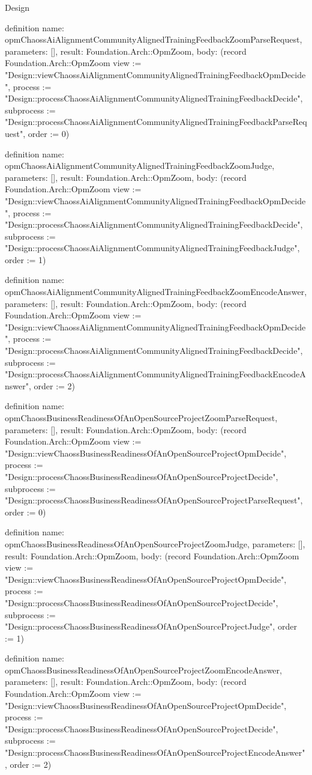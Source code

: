 \begin{lexlean}{Design}
\begin{semanticmodule}
definition{
  name: opmChaossAiAlignmentCommunityAlignedTrainingFeedbackZoomParseRequest,
  parameters: [],
  result: Foundation.Arch::OpmZoom,
  body: (record Foundation.Arch::OpmZoom {view := "Design::viewChaossAiAlignmentCommunityAlignedTrainingFeedbackOpmDecide", process := "Design::processChaossAiAlignmentCommunityAlignedTrainingFeedbackDecide", subprocess := "Design::processChaossAiAlignmentCommunityAlignedTrainingFeedbackParseRequest", order := 0})
}

definition{
  name: opmChaossAiAlignmentCommunityAlignedTrainingFeedbackZoomJudge,
  parameters: [],
  result: Foundation.Arch::OpmZoom,
  body: (record Foundation.Arch::OpmZoom {view := "Design::viewChaossAiAlignmentCommunityAlignedTrainingFeedbackOpmDecide", process := "Design::processChaossAiAlignmentCommunityAlignedTrainingFeedbackDecide", subprocess := "Design::processChaossAiAlignmentCommunityAlignedTrainingFeedbackJudge", order := 1})
}

definition{
  name: opmChaossAiAlignmentCommunityAlignedTrainingFeedbackZoomEncodeAnswer,
  parameters: [],
  result: Foundation.Arch::OpmZoom,
  body: (record Foundation.Arch::OpmZoom {view := "Design::viewChaossAiAlignmentCommunityAlignedTrainingFeedbackOpmDecide", process := "Design::processChaossAiAlignmentCommunityAlignedTrainingFeedbackDecide", subprocess := "Design::processChaossAiAlignmentCommunityAlignedTrainingFeedbackEncodeAnswer", order := 2})
}

definition{
  name: opmChaossBusinessReadinessOfAnOpenSourceProjectZoomParseRequest,
  parameters: [],
  result: Foundation.Arch::OpmZoom,
  body: (record Foundation.Arch::OpmZoom {view := "Design::viewChaossBusinessReadinessOfAnOpenSourceProjectOpmDecide", process := "Design::processChaossBusinessReadinessOfAnOpenSourceProjectDecide", subprocess := "Design::processChaossBusinessReadinessOfAnOpenSourceProjectParseRequest", order := 0})
}

definition{
  name: opmChaossBusinessReadinessOfAnOpenSourceProjectZoomJudge,
  parameters: [],
  result: Foundation.Arch::OpmZoom,
  body: (record Foundation.Arch::OpmZoom {view := "Design::viewChaossBusinessReadinessOfAnOpenSourceProjectOpmDecide", process := "Design::processChaossBusinessReadinessOfAnOpenSourceProjectDecide", subprocess := "Design::processChaossBusinessReadinessOfAnOpenSourceProjectJudge", order := 1})
}

definition{
  name: opmChaossBusinessReadinessOfAnOpenSourceProjectZoomEncodeAnswer,
  parameters: [],
  result: Foundation.Arch::OpmZoom,
  body: (record Foundation.Arch::OpmZoom {view := "Design::viewChaossBusinessReadinessOfAnOpenSourceProjectOpmDecide", process := "Design::processChaossBusinessReadinessOfAnOpenSourceProjectDecide", subprocess := "Design::processChaossBusinessReadinessOfAnOpenSourceProjectEncodeAnswer", order := 2})
}


\end{semanticmodule}
\end{lexlean}
